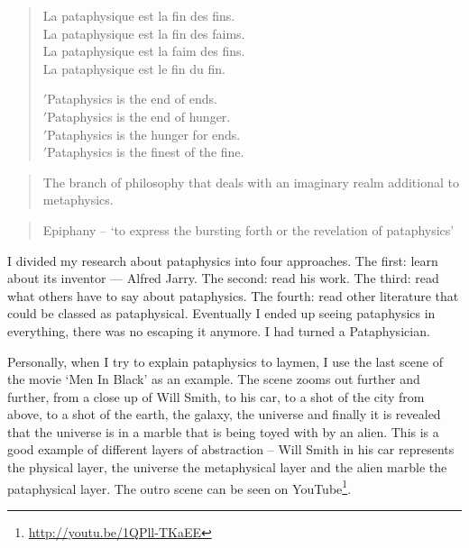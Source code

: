 \begin{quotation}
  \begin{multicols}{2}
  La pataphysique est la fin des fins.\\
  La pataphysique est la fin des faims.\\
  La pataphysique est la faim des fins.\\
  La pataphysique est le fin du fin.
  \par \vfill \columnbreak{}
  \begin{flushright}
  $'$Pataphysics is the end of ends.\\
  $'$Pataphysics is the end of hunger.\\
  $'$Pataphysics is the hunger for ends.\\
  $'$Pataphysics is the finest of the fine.
  \end{flushright}
  \end{multicols}
\end{quotation}

\begin{quotation}
  The branch of philosophy that deals with an imaginary realm additional to metaphysics. 
\end{quotation}

\begin{quotation}
  Epiphany – `to express the bursting forth or the revelation of pataphysics' 
\end{quotation}

I divided my research about pataphysics into four approaches. The first: learn about its inventor --- Alfred Jarry. The second: read his work. The third: read what others have to say about pataphysics. The fourth: read other literature that could be classed as pataphysical. Eventually I ended up seeing pataphysics in everything, there was no escaping it anymore. I had turned a Pataphysician.

Personally, when I try to explain pataphysics to laymen, I use the last scene of the movie `Men In Black' as an example. The scene zooms out further and further, from a close up of Will Smith, to his car, to a shot of the city from above, to a shot of the earth, the galaxy, the universe and finally it is revealed that the universe is in a marble that is being toyed with by an alien. This is a good example of different layers of abstraction – Will Smith in his car represents the physical layer, the universe the metaphysical layer and the alien marble the pataphysical layer. The outro scene can be seen on YouTube\footnote{\url{http://youtu.be/1QPll-TKaEE}}.

